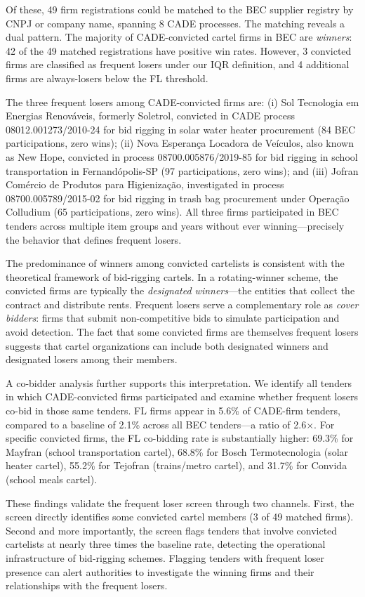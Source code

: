 Of these, 49 firm registrations could be matched to the BEC supplier registry by CNPJ or company name, spanning 8 CADE processes. The matching reveals a dual pattern. The majority of CADE-convicted cartel firms in BEC are \textit{winners}: 42 of the 49 matched registrations have positive win rates. However, 3 convicted firms are classified as frequent losers under our IQR definition, and 4 additional firms are always-losers below the FL threshold.

The three frequent losers among CADE-convicted firms are: (i) Sol Tecnologia em Energias Renov\'{a}veis, formerly Soletrol, convicted in CADE process 08012.001273/2010-24 for bid rigging in solar water heater procurement (84 BEC participations, zero wins); (ii) Nova Esperan\c{c}a Locadora de Ve\'{i}culos, also known as New Hope, convicted in process 08700.005876/2019-85 for bid rigging in school transportation in Fernand\'{o}polis-SP (97 participations, zero wins); and (iii) Jofran Com\'{e}rcio de Produtos para Higieniza\c{c}\~{a}o, investigated in process 08700.005789/2015-02 for bid rigging in trash bag procurement under Opera\c{c}\~{a}o Colludium (65 participations, zero wins). All three firms participated in BEC tenders across multiple item groups and years without ever winning---precisely the behavior that defines frequent losers.

The predominance of winners among convicted cartelists is consistent with the theoretical framework of bid-rigging cartels. In a rotating-winner scheme, the convicted firms are typically the \textit{designated winners}---the entities that collect the contract and distribute rents. Frequent losers serve a complementary role as \textit{cover bidders}: firms that submit non-competitive bids to simulate participation and avoid detection. The fact that some convicted firms are themselves frequent losers suggests that cartel organizations can include both designated winners and designated losers among their members.

A co-bidder analysis further supports this interpretation. We identify all tenders in which CADE-convicted firms participated and examine whether frequent losers co-bid in those same tenders. FL firms appear in 5.6\% of CADE-firm tenders, compared to a baseline of 2.1\% across all BEC tenders---a ratio of 2.6$\times$. For specific convicted firms, the FL co-bidding rate is substantially higher: 69.3\% for Mayfran (school transportation cartel), 68.8\% for Bosch Termotecnologia (solar heater cartel), 55.2\% for Tejofran (trains/metro cartel), and 31.7\% for Convida (school meals cartel).

These findings validate the frequent loser screen through two channels. First, the screen directly identifies some convicted cartel members (3 of 49 matched firms). Second and more importantly, the screen flags tenders that involve convicted cartelists at nearly three times the baseline rate, detecting the operational infrastructure of bid-rigging schemes. Flagging tenders with frequent loser presence can alert authorities to investigate the winning firms and their relationships with the frequent losers.
